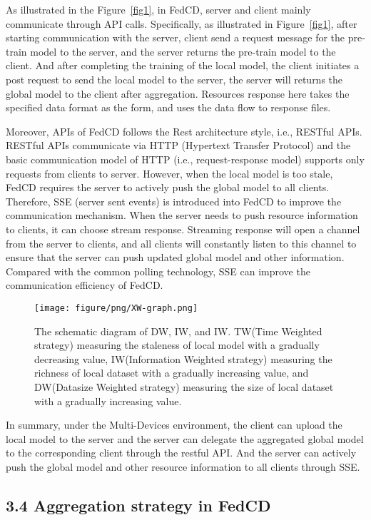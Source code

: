 \documentclass[twoside,twocolumn]{article}
\begin{document}
\begin{spacing}{1.0}
	As illustrated in the Figure~\ref{fig1}, in FedCD, server and client mainly communicate through API calls. Specifically, as illustrated in Figure~\ref{fig1}, after starting communication with the server, client send a request message for the pre-train model to the server, and the server returns the pre-train model to the client. And after completing the training of the local model, the client initiates a post request to send the local model to the server, the server will returns the global model to the client after aggregation. Resources response here takes the specified data format as the form, and uses the data flow to response files. 

	Moreover, APIs of FedCD follows the Rest architecture style, i.e., RESTful APIs. RESTful APIs communicate via HTTP (Hypertext Transfer Protocol) and the basic communication model of HTTP (i.e., request-response model) supports only requests from clients to server. However, when the local model is too stale, FedCD requires the server to actively push the global model to all clients. Therefore, SSE (server sent events) is introduced into FedCD to improve the communication mechanism. When the server needs to push resource information to clients, it can choose stream response. Streaming response will open a channel from the server to clients, and all clients will constantly listen to this channel to ensure that the server can push updated global model and other information. Compared with the common polling technology, SSE can improve the communication efficiency of FedCD.

\begin{figure*}
\centerline{\texttt{[image: figure/png/XW-graph.png]}}
\caption{The schematic diagram of DW, IW, and IW. TW(Time Weighted strategy) measuring the staleness of local model with a gradually decreasing value, IW(Information Weighted strategy) measuring the richness of local dataset with a gradually increasing value, and DW(Datasize Weighted strategy) measuring the size of local dataset with a gradually increasing value.} \label{fig2}
\end{figure*}

	In summary, under the Multi-Devices environment, the client can upload the local model to the server and the server can delegate the aggregated global model to the corresponding client through the restful API. And the server can actively push the global model and other resource information to all clients through SSE.

\subsection{3.4 Aggregation strategy in FedCD}


\end{spacing}
\end{document}
